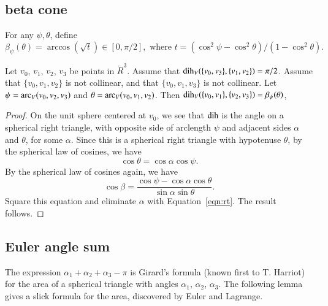 \subsection{beta cone}

\begin{definition}[beta]  For any $\psi,\theta$, define
   $$
   \beta_\psi(\theta) = \arccos(\sqrt{t}) \in[0,\pi/2],\text{ where }
   t = (\cos^2\psi-\cos^2\theta)/(1-\cos^2\theta).
   $$
\end{definition}

\begin{lemma}\label{lemma:beta-cone}
Let $v_0$, $v_1$, $v_2$, $v_3$ be points in $\ring{R}^3$.   
Assume
that $\operatorname{dih}_V(\{v_0,v_3\},\{v_1,v_2\})=\pi/2$. 
Assume that $\{v_0,v_1,v_2\}$ is not collinear, and that
$\{v_0,v_1,v_3\}$ is not collinear. Let
$\psi = \operatorname{arc}_V(v_0,v_2,v_3)$ and $\theta=\operatorname{arc}_V(v_0,v_1,v_2)$. 
Then $\operatorname{dih}_V(\{v_0,v_1\},\{v_2,v_3\}) = \beta_\psi(\theta)$,
\end{lemma}

\begin{proof}  On the unit sphere centered at $v_0$, we see that
$\operatorname{dih}$ is the angle on a spherical right triangle,
with opposite side of arclength $\psi$ and adjacent sides $\alpha$
and $\theta$, for some $\alpha$. 
 Since this is a spherical right triangle with hypotenuse
$\theta$, by the spherical law of cosines, we have
   \begin{equation}\label{eqn:rt}
     \cos\theta = \cos\alpha \cos\psi.
     \end{equation}
By the spherical law of cosines again, we have
    $$
    \cos\beta = \frac{\cos\psi - \cos\alpha\cos\theta}{\sin\alpha\sin\theta}.
    $$
Square this equation and eliminate $\alpha$ with Equation~\ref{eqn:rt}.
The result follows.
\end{proof}




\subsection{Euler angle sum}

The expression $\alpha_1+\alpha_2+\alpha_3-\pi$ is Girard's
formula (known first to T. Harriot) 
for the area of a spherical triangle with angles
$\alpha_1$, $\alpha_2$, $\alpha_3$.  The following lemma
gives a slick formula for the area, discovered by
Euler and Lagrange.

